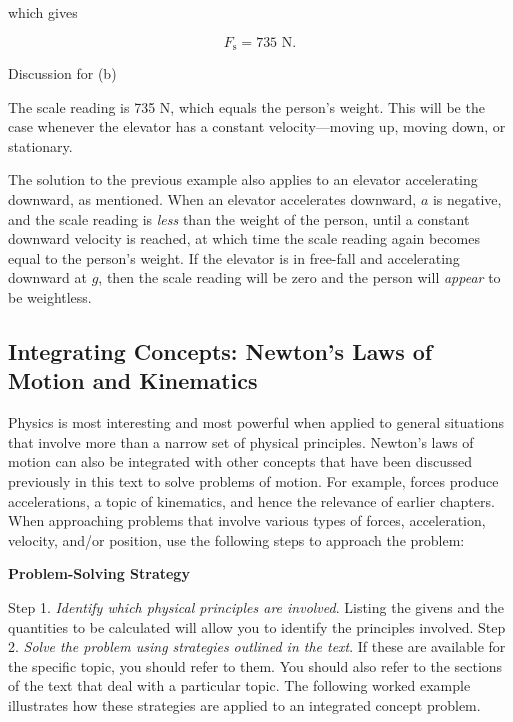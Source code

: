 \documentclass[
]{book}
\newenvironment{tinysection}{}{}
\begin{document}
which gives

\leavevmode\hypertarget{eip-id1499798}{}%
\[{{F_{\text{s}} = 7}\text{35\ N}}.\]

\begin{tinysection}

{Discussion for (b)}

\end{tinysection}

The scale reading is 735 N, which equals the person's weight. This will
be the case whenever the elevator has a constant velocity---moving up,
moving down, or stationary.

The solution to the previous example also applies to an elevator
accelerating downward, as mentioned. When an elevator accelerates
downward, \(a{}\) is negative, and the scale reading is \emph{less} than the
weight of the person, until a constant downward velocity is reached, at
which time the scale reading again becomes equal to the person's weight.
If the elevator is in free-fall and accelerating downward at \(g{}\), then
the scale reading will be zero and the person will \emph{appear} to be
weightless.

\hypertarget{fs-id1517458}{}
\hypertarget{integrating-concepts-newtons-laws-of-motion-and-kinematics}{%
\subsection{Integrating Concepts: Newton's Laws of Motion and Kinematics}\label{integrating-concepts-newtons-laws-of-motion-and-kinematics}}

Physics is most interesting and most powerful when applied to general
situations that involve more than a narrow set of physical principles.
Newton's laws of motion can also be integrated with other concepts that
have been discussed previously in this text to solve problems of motion.
For example, forces produce accelerations, a topic of kinematics, and
hence the relevance of earlier chapters. When approaching problems that
involve various types of forces, acceleration, velocity, and/or
position, use the following steps to approach the problem:

\textbf{Problem-Solving Strategy}

Step 1. \emph{Identify which physical principles are involved}. Listing the
givens and the quantities to be calculated will allow you to identify
the principles involved. {\hfill\break
}Step 2. \emph{Solve the problem using strategies
outlined in the text}. If these are available for the specific topic,
you should refer to them. You should also refer to the sections of the
text that deal with a particular topic. The following worked example
illustrates how these strategies are applied to an integrated concept
problem.
\end{document}
